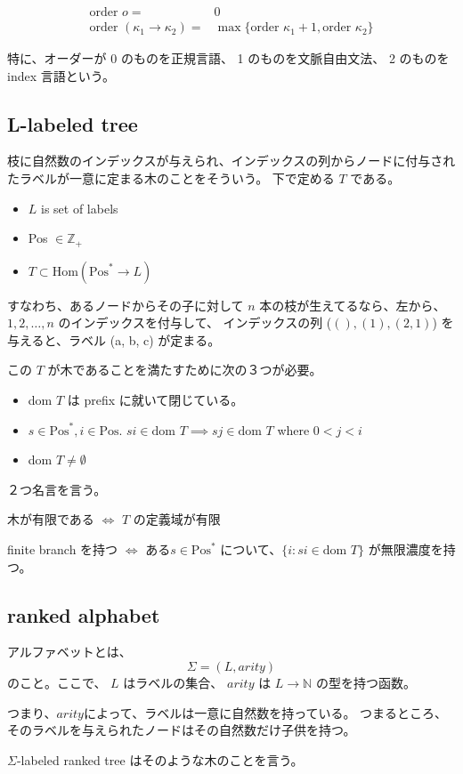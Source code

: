 \documentclass[]{jsarticle}
\begin{document}
\def\order{\text{order }}
\begin{align*}
  \order o = & 0 \\
  \order (\kappa_1 \rightarrow \kappa_2) = & \max \{ \order \kappa_1 +1, \order \kappa_2 \}
\end{align*}

特に、オーダーが 0 のものを正規言語、
1 のものを文脈自由文法、
2 のものをindex 言語という。

\subsection{L-labeled tree}

枝に自然数のインデックスが与えられ、インデックスの列からノードに付与されたラベルが一意に定まる木のことをそういう。
下で定める $T$ である。

\begin{itemize}
  \item $L$ is set of labels
  \item Pos $\in \mathbb{Z}_+$
  \item $T \subset \text{Hom} (\text{Pos}^* \rightarrow L)$
\end{itemize}

すなわち、あるノードからその子に対して $n$ 本の枝が生えてるなら、左から、$1, 2, \ldots, n$ のインデックスを付与して、
インデックスの列 ($(), (1), (2, 1)$) を与えると、ラベル (a, b, c) が定まる。

この $T$ が木であることを満たすために次の３つが必要。

\begin{itemize}
  \item dom $T$ は prefix に就いて閉じている。
  \item $s \in \text{Pos}^*, i \in \text{Pos}$. $si \in \text{dom } T \implies sj \in \text{dom }T $  where $0 < j < i$
  \item dom $T \ne \emptyset$
\end{itemize}

２つ名言を言う。

木が有限である $\iff$ $T$ の定義域が有限

finite branch を持つ $\iff$ ある$s \in \text{Pos}^*$ について、$\{ i : s i \in \text{dom }T\}$ が無限濃度を持つ。

\subsection{ranked alphabet}

アルファベットとは、
\[ \Sigma = (L,arity) \]
のこと。ここで、
$L$ はラベルの集合、
$arity$ は $L \rightarrow \mathbb{N}$ の型を持つ函数。

つまり、$arity$によって、ラベルは一意に自然数を持っている。
つまるところ、そのラベルを与えられたノードはその自然数だけ子供を持つ。

$\Sigma$-labeled ranked tree はそのような木のことを言う。
\end{document}
